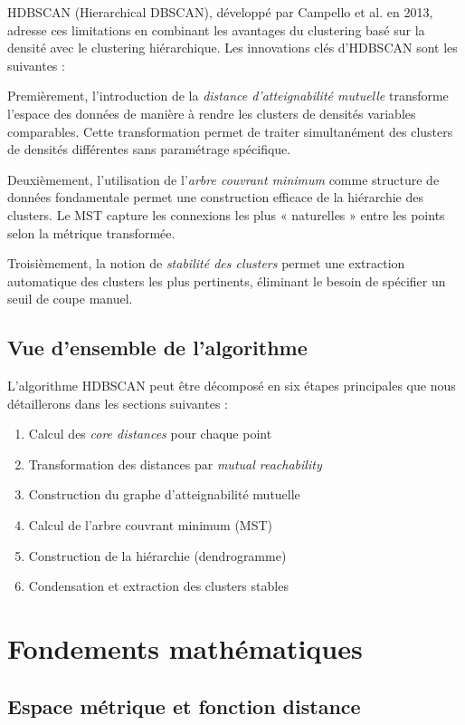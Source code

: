 \documentclass[11pt,a4paper]{article}
\begin{document}
HDBSCAN (Hierarchical DBSCAN), développé par Campello et al. en 2013, adresse ces limitations en combinant les avantages du clustering basé sur la densité avec le clustering hiérarchique. Les innovations clés d'HDBSCAN sont les suivantes :

Premièrement, l'introduction de la \textit{distance d'atteignabilité mutuelle} transforme l'espace des données de manière à rendre les clusters de densités variables comparables. Cette transformation permet de traiter simultanément des clusters de densités différentes sans paramétrage spécifique.

Deuxièmement, l'utilisation de l'\textit{arbre couvrant minimum} comme structure de données fondamentale permet une construction efficace de la hiérarchie des clusters. Le MST capture les connexions les plus « naturelles » entre les points selon la métrique transformée.

Troisièmement, la notion de \textit{stabilité des clusters} permet une extraction automatique des clusters les plus pertinents, éliminant le besoin de spécifier un seuil de coupe manuel.

\subsection{Vue d'ensemble de l'algorithme}

L'algorithme HDBSCAN peut être décomposé en six étapes principales que nous détaillerons dans les sections suivantes :

\begin{enumerate}
    \item Calcul des \textit{core distances} pour chaque point
    \item Transformation des distances par \textit{mutual reachability}
    \item Construction du graphe d'atteignabilité mutuelle
    \item Calcul de l'arbre couvrant minimum (MST)
    \item Construction de la hiérarchie (dendrogramme)
    \item Condensation et extraction des clusters stables
\end{enumerate}

\section{Fondements mathématiques}

\subsection{Espace métrique et fonction distance}
\end{document}
